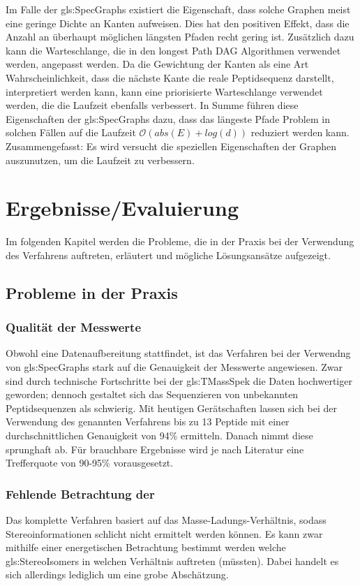 \documentclass[a4paper, 12pt]{article}
\newcommand{\gerquot}[1]{\glqq#1\grqq}
\newcommand{\dashAndSpace}{\textendash \space}
\begin{document}
Im Falle der \glspl{gls:SpecGraph} existiert die Eigenschaft, dass solche Graphen meist eine geringe Dichte an Kanten aufweisen. Dies hat den positiven Effekt, dass die Anzahl an überhaupt möglichen längsten Pfaden recht gering ist. Zusätzlich dazu kann die Warteschlange, die in den longest Path DAG Algorithmen verwendet werden, angepasst werden. Da die Gewichtung der Kanten als eine Art \gerquot{Wahrscheinlichkeit}, dass die nächste Kante die reale Peptidsequenz darstellt, interpretiert werden kann, kann eine priorisierte Warteschlange verwendet werden, die die Laufzeit ebenfalls verbessert. In Summe führen diese Eigenschaften der \glspl{gls:SpecGraph} dazu, dass das längeste Pfade Problem in solchen Fällen auf die Laufzeit $\mathcal{O}(abs(E) + log(d))$ reduziert werden kann.\\

Zusammengefasst: Es wird versucht die speziellen Eigenschaften der Graphen auszunutzen, um die Laufzeit zu verbessern.


\section{Ergebnisse/Evaluierung}
Im folgenden Kapitel werden die Probleme, die in der Praxis bei der Verwendung des Verfahrens auftreten, erläutert und mögliche Lösungsansätze aufgezeigt.

\subsection{Probleme in der Praxis}
\subsubsection{Qualität der Messwerte}
Obwohl eine Datenaufbereitung stattfindet, ist das Verfahren bei der Verwendng von \glspl{gls:SpecGraph} stark auf die Genauigkeit der Messwerte angewiesen. Zwar sind durch technische Fortschritte bei der \gls{gls:TMassSpek} die Daten hochwertiger geworden; dennoch gestaltet sich das Sequenzieren von unbekannten Peptidsequenzen als schwierig. Mit heutigen Gerätschaften lassen sich bei der Verwendung des genannten Verfahrens bis zu 13 Peptide mit einer durchschnittlichen Genauigkeit von 94\% ermitteln. Danach nimmt diese sprunghaft ab. Für brauchbare Ergebnisse wird \dashAndSpace je nach Literatur \dashAndSpace eine Trefferquote von 90-95\% vorausgesetzt.
\subsubsection{Fehlende Betrachtung der }\label{FehlendeStereoInfos}
Das komplette Verfahren basiert auf das Masse-Ladungs-Verhältnis, sodass Stereoinformationen schlicht nicht ermittelt werden können. Es kann zwar mithilfe einer energetischen Betrachtung bestimmt werden welche \glspl{gls:StereoIsomer} in welchen Verhältnis auftreten (müssten). Dabei handelt es sich allerdings lediglich um eine grobe Abschätzung.
\end{document}
